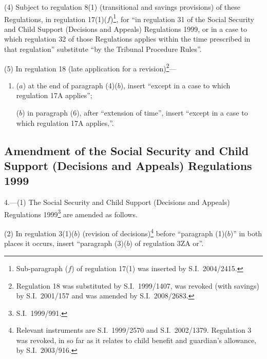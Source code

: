 \documentclass[12pt,a4paper]{article}
\begin{document}
(4) Subject to regulation 8(1) (transitional and savings provisions) of these Regulations, in regulation 17(1)($f$)\footnote{Sub-paragraph ($f$)  of regulation 17(1) was inserted by S.I.~2004/2415.}, for “in regulation 31 of the Social Security and Child Support (Decisions and Appeals) Regulations 1999, or in a case to which regulation 32 of those Regulations applies within the time prescribed in that regulation” substitute “by the Tribunal Procedure Rules”.

(5) In regulation 18 (late application for a revision)\footnote{Regulation 18 was substituted by S.I.~1999/1407, was revoked (with savings) by S.I.~2001/157 and was amended by S.I.~2008/2683.}—
\begin{enumerate}\item[]
($a$) at the end of paragraph (4)($b$), insert “except in a case to which regulation 17A applies”;

($b$) in paragraph (6), after “extension of time”, insert “except in a case to which regulation 17A applies,”.
\end{enumerate}

\subsection[4. Amendment of the Social Security and Child Support (Decisions and Appeals) Regulations 1999]{Amendment of the Social Security and Child Support (Decisions and Appeals) Regulations 1999}

4.---(1)  The Social Security and Child Support (Decisions and Appeals) Regulations 1999\footnote{S.I.~1999/991.} are amended as follows.

(2) In regulation 3(1)($b$)  (revision of decisions)\footnote{Relevant instruments are S.I.~1999/2570 and S.I.~2002/1379. Regulation 3 was revoked, in so far as it relates to child benefit and guardian’s allowance, by S.I.~2003/916.} before “paragraph (1)($b$)” in both places it occurs, insert “paragraph (3)($b$)  of regulation 3ZA or”.
\end{document}

